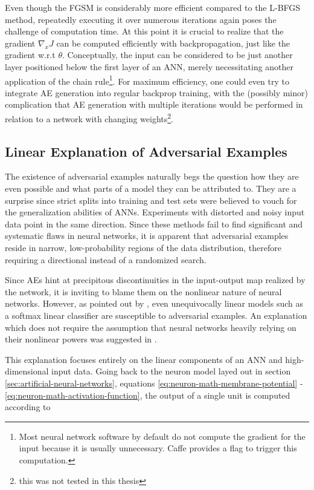 \documentclass[11pt, a4paper]{article}
\begin{document}
Even though the FGSM is considerably more efficient compared to the L-BFGS method, repeatedly executing it over numerous iterations again poses the challenge of computation time. At this point it is crucial to realize that the gradient $\nabla_x J$ can be computed efficiently with backpropagation, just like the gradient w.r.t $\theta$. Conceptually, the input can be considered to be just another layer positioned below the first layer of an ANN, merely necessitating another application of the chain rule\footnote{Most neural network software by default do not compute the gradient for the input because it is usually unnecessary. Caffe provides a flag to trigger this computation.}. For maximum efficiency, one could even try to integrate AE generation into regular backprop training, with the (possibly minor) complication that AE generation with multiple iterations would be performed in relation to a network with changing weights\footnote{this was not tested in this thesis}.

\subsection{Linear Explanation of Adversarial Examples}
\label{subsec:ae-linear-explanation}
The existence of adversarial examples naturally begs the question how they are even possible and what parts of a model they can be attributed to. They are a surprise since strict splits into training and test sets were believed to vouch for the generalization abilities of ANNs. Experiments with distorted and noisy input data point in the same direction. Since these methods fail to find significant and systematic flaws in neural networks, it is apparent that adversarial examples reside in narrow, low-probability regions of the data distribution, therefore requiring a directional instead of a randomized search.

Since AEs hint at precipitous discontinuities in the input-output map realized by the network, it is inviting to blame them on the nonlinear nature of neural networks. However, as pointed out by \cite{intriguing-properties-of-neural-networks}, even unequivocally linear models such as a softmax linear classifier are susceptible to adversarial examples. An explanation which does not require the assumption that neural networks heavily relying on their nonlinear powers was suggested in \cite{explaining-and-harnessing-adversarial-examples}.

This explanation focuses entirely on the linear components of an ANN and high-dimensional input data. Going back to the neuron model layed out in section \ref{sec:artificial-neural-networks}, equations \eqref{eq:neuron-math-membrane-potential} - \eqref{eq:neuron-math-activation-function}, the output of a single unit is computed according to
\end{document}
